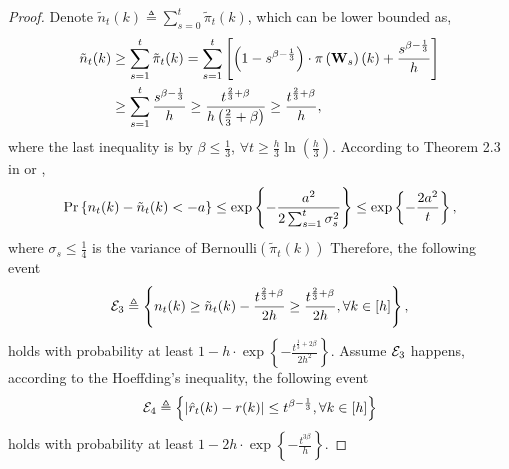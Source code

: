 \begin{proof}
    Denote $\tilde{n}_t(k) \triangleq \sum\limits_{s=0}^{t}{ \tilde{\pi}_t(k)}$, which can be lower bounded as,
\begin{equation*}
\begin{split}
    \tilde{n}_t(k) &\ge \sum\limits_{s=1}^{t}{ \tilde{\pi}_t(k)} = \sum\limits_{s=1}^{t}{ \left[ \left( 1 - s^{\beta - \frac{1}{3}} \right) \cdot \pi\left({\mathbf{W}}_{s}\right)(k) + \frac{s^{\beta - \frac{1}{3}}}{h} \right] } \\
    &\ge \sum\limits_{s=1}^{t}{ \frac{s^{\beta - \frac{1}{3}}}{h} } \ge \frac{t^{\frac{2}{3} + \beta}}{ h  \left(\frac{2}{3} + \beta \right) } \ge \frac{t^{\frac{2}{3} + \beta}}{ h },
\end{split}
\end{equation*}
where the last inequality is by $\beta \le \frac{1}{3}$, $\forall t \ge \frac{h}{3} \ln{\left(\frac{h}{3}\right) }$. According to Theorem 2.3 in \citep{wainwright2015mathematical} or \citep{wainwright2019high},
\begin{equation*}
\begin{split}
    {\text{Pr}}\left\{ n_t(k) - \tilde{n}_t(k) < - a \right\} \le \exp\left\{ - \frac{a^2}{2 \sum_{s=1}^{t}{\sigma_s^2} } \right\} \le \exp\left\{ - \frac{2 a^2}{ t } \right\},
\end{split}
\end{equation*}
where $\sigma_s \le \frac{1}{4}$ is the variance of $\text{Bernoulli}\left( \tilde{\pi}_t(k) \right)$
Therefore, the following event
\begin{equation*}
    {\mathcal{E}}_3 \triangleq \left\{ n_t(k) \ge \tilde{n}_t(k) - \frac{t^{\frac{2}{3} + \beta}}{ 2 h } \ge \frac{t^{\frac{2}{3} + \beta}}{ 2 h }, \forall k \in [h] \right\},
\end{equation*}
holds with probability at least $1 - h \cdot \exp\left\{ -  \frac{t^{\frac{1}{3} + 2 \beta}}{2 h^2} \right\}$. Assume ${\mathcal{E}}_3$ happens, according to the Hoeffding's inequality, the following event
\begin{equation*}
    {\mathcal{E}}_4 \triangleq \left\{ \left| \hat{r}_{t}(k) - r(k) \right| \le t^{\beta - \frac{1}{3}} , \forall k \in [h] \right\}
\end{equation*}
holds with probability at least $1 - 2 h \cdot \exp\left\{ - \frac{t^{3\beta}}{ h } \right\}$.
\end{proof}

